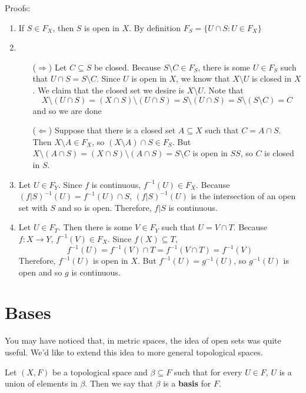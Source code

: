 Proofs: 
\begin{enumerate}
	\item If $S \in F_X$, then $S$ is open in $X$. By definition $F_S = \{ U\cap S : U\in F_X\}$ 
	\item 
	\begin{itemize}
		\item [($\Rightarrow$)] Let $C\subseteq S$ be closed. Because $S\setminus C \in F_S$, there is some $U\in F_S$ such that $U\cap S = S\setminus C$. Since $U$ is open in $X$, we know that $X\setminus U$ is closed in $X$. We claim that the closed set we desire is $X\setminus U$. Note that
		\[ X\setminus (U\cap S) = (X\cap S)\setminus (U\cap S) = S\setminus (U\cap S) = S\setminus (S\setminus C) = C\]
		and so we are done 
		\item [($\Leftarrow$)] Suppose that there is a closed set $A\subseteq X$ such that $C = A\cap S$. Then $X\setminus A \in F_X$, so $(X\setminus A)\cap S \in F_S$. But $X\setminus (A\cap S) = (X\cap S)\setminus (A\cap S) = S\setminus C$ is open in $SS$, so $C$ is closed in $S$. 
	\end{itemize}
	\item Let $U\in F_Y$. Since $f$ is continuous, $f^{-1}(U)\in F_X$. Because $(f|S)^{-1}(U) = f^{-1}(U)\cap S$, $(f|S)^{-1}(U)$ is the intersection of an open set with $S$ and so is open. Therefore, $f|S$ is continuous. 
	\item Let $U\in F_T$. Then there is some $V\in F_Y$ such that $U = V\cap T$. Because $f:X\to Y$, $f^{-1}(V)\in F_X$. Since $f(X)\subseteq T$,
	\[ f^{-1}(U) = f^{-1}(V)\cap T = f^{-1}(V\cap T) = f^{-1}(V) \]
	Therefore, $f^{-1}(U)$ is open in $X$. But $f^{-1}(U) = g^{-1}(U)$, so $g^{-1}(U)$ is open and so $g$ is continuous. 
\end{enumerate}

\section{Bases} You may have noticed that, in metric spaces, the idea of open sets was quite useful. We'd like to extend this idea to more general topological spaces.
\begin{definition}
	Let $(X,F)$ be a topological space and $\beta\subseteq F$ such that for every $U\in F$, $U$ is a union of elements in $\beta$. Then we say that $\beta$ is a {\bf basis} for $F$. 
\end{definition}

